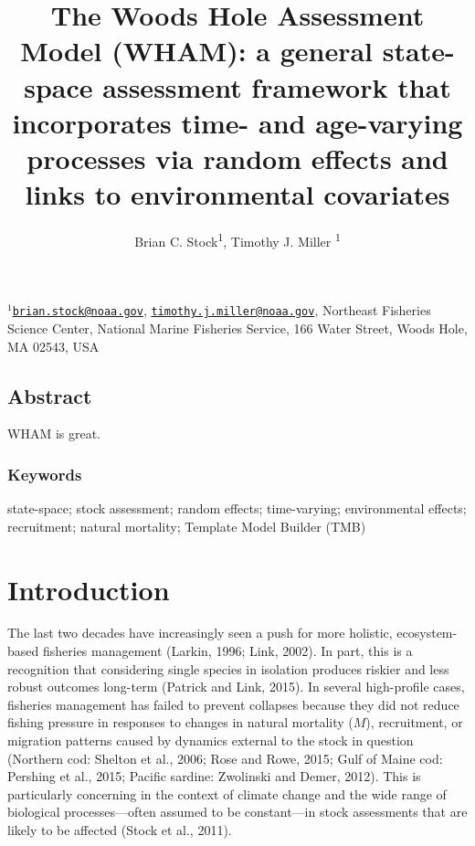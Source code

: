 \documentclass[]{article}
\title{The Woods Hole Assessment Model (WHAM): a general state-space assessment
framework that incorporates time- and age-varying processes via random
effects and links to environmental covariates}
\author{Brian C. Stock\textsuperscript{1}, Timothy J. Miller \textsuperscript{1}}
\date{}
\begin{document}
\maketitle

\(^1\)\href{mailto:brian.stock@noaa.gov}{\nolinkurl{brian.stock@noaa.gov}},
\href{mailto:timothy.j.miller@noaa.gov}{\nolinkurl{timothy.j.miller@noaa.gov}},
Northeast Fisheries Science Center, National Marine Fisheries Service,
166 Water Street, Woods Hole, MA 02543, USA\\

\pagebreak

\hypertarget{abstract}{%
\subsection*{Abstract}\label{abstract}}

WHAM is great.

\hypertarget{keywords}{%
\subsubsection*{Keywords}\label{keywords}}

state-space; stock assessment; random effects; time-varying;
environmental effects; recruitment; natural mortality; Template Model
Builder (TMB)

\pagebreak

\hypertarget{introduction}{%
\section{Introduction}\label{introduction}}

The last two decades have increasingly seen a push for more holistic,
ecosystem-based fisheries management (Larkin, 1996; Link, 2002). In
part, this is a recognition that considering single species in isolation
produces riskier and less robust outcomes long-term (Patrick and Link,
2015). In several high-profile cases, fisheries management has failed to
prevent collapses because they did not reduce fishing pressure in
responses to changes in natural mortality (\(M\)), recruitment, or
migration patterns caused by dynamics external to the stock in question
(Northern cod: Shelton et al., 2006; Rose and Rowe, 2015; Gulf of Maine
cod: Pershing et al., 2015; Pacific sardine: Zwolinski and Demer, 2012).
This is particularly concerning in the context of climate change and the
wide range of biological processes---often assumed to be constant---in
stock assessments that are likely to be affected (Stock et al., 2011).
\end{document}
